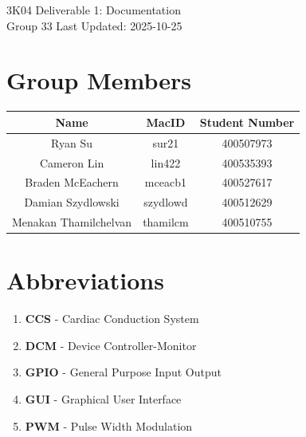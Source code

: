 \documentclass{article}
\begin{document}

\begin{titlepage}
    \begin{center}
        \vspace*{1cm}
        \Huge
        3K04 Deliverable 1: Documentation
        \vspace{1cm}\\
        \huge
        Group 33
        \normalsize
        \vfill
        Last Updated: 2025-10-25
    \end{center}
 \end{titlepage}


\newpage
\tableofcontents


\newpage
{}
\listoffigures
{}

\listoftables
{}


\clearpage
{}
\newpage
\section{Group Members}
\begin{tabular}{|c|c|c|}
    \hline
    Name        & MacID         & Student Number    \\
    \hline
    Ryan Su     & sur21         & 400507973         \\
    \hline
    Cameron Lin & lin422        & 400535393         \\
    \hline
    Braden McEachern & mceacb1  & 400527617 \\
    \hline
    Damian Szydlowski & szydlowd & 400512629 \\
    \hline
    Menakan Thamilchelvan & thamilcm & 400510755\\ 
    \hline
\end{tabular}

\newpage
\section{Abbreviations}
\begin{enumerate}[label=]
    \item \textbf{CCS} - Cardiac Conduction System
    \item \textbf{DCM} - Device Controller-Monitor
    \item \textbf{GPIO} - General Purpose Input Output
    \item \textbf{GUI} - Graphical User Interface
    \item \textbf{PWM} - Pulse Width Modulation
\end{enumerate}
\end{document}
